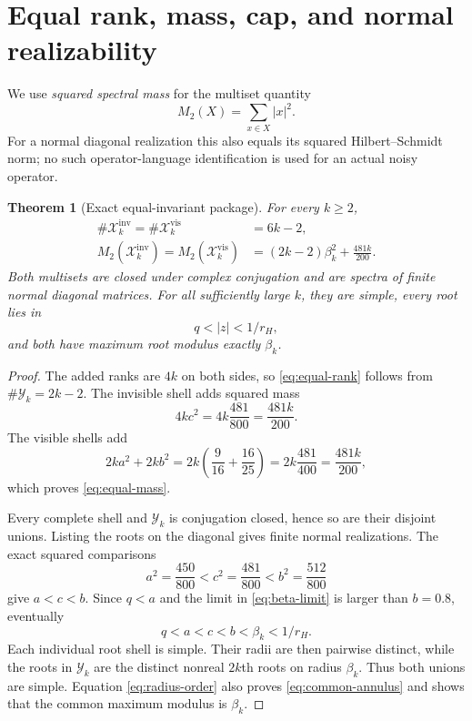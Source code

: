 \documentclass[11pt]{article}
\newtheorem{theorem}{Theorem}[section]
\theoremstyle{remark}
\newcommand{\cY}{\mathcal Y}
\newcommand{\cX}{\mathcal X}
\newcommand{\inv}{\mathrm{inv}}
\newcommand{\vis}{\mathrm{vis}}
\begin{document}
\section{Equal rank, mass, cap, and normal realizability}

We use \emph{squared spectral mass} for the multiset quantity
\begin{equation}\label{eq:squared-mass}
 M_2(X)=\sum_{x\in X}|x|^2.
\end{equation}
For a normal diagonal realization this also equals its squared
Hilbert--Schmidt norm; no such operator-language identification is used for
an actual noisy operator.

\begin{theorem}[Exact equal-invariant package]
\label{thm:equal-invariants}
For every $k\ge2$,
\begin{align}
 \#\cX_k^{\inv}=\#\cX_k^{\vis}&=6k-2,
 \label{eq:equal-rank}\\
 M_2(\cX_k^{\inv})=M_2(\cX_k^{\vis})
 &=(2k-2)\beta_k^2+\frac{481k}{200}.
 \label{eq:equal-mass}
\end{align}
Both multisets are closed under complex conjugation and are spectra of finite
normal diagonal matrices.  For all sufficiently large $k$, they are simple,
every root lies in
\begin{equation}\label{eq:common-annulus}
 q<|z|<1/r_H,
\end{equation}
and both have maximum root modulus exactly $\beta_k$.
\end{theorem}

\begin{proof}
The added ranks are $4k$ on both sides, so \eqref{eq:equal-rank} follows
from $\#\cY_k=2k-2$.  The invisible shell adds squared mass
\[
 4kc^2=4k\frac{481}{800}=\frac{481k}{200}.
\]
The visible shells add
\[
 2ka^2+2kb^2
 =2k\left(\frac9{16}+\frac{16}{25}\right)
 =2k\frac{481}{400}=\frac{481k}{200},
\]
which proves \eqref{eq:equal-mass}.

Every complete shell and $\cY_k$ is conjugation closed, hence so are their
disjoint unions.  Listing the roots on the diagonal gives finite normal
realizations.  The exact squared comparisons
\begin{equation}\label{eq:radius-squares}
 a^2=\frac{450}{800}<c^2=\frac{481}{800}
 <b^2=\frac{512}{800}
\end{equation}
give $a<c<b$.  Since $q<a$ and the limit in \eqref{eq:beta-limit} is larger
than $b=0.8$, eventually
\begin{equation}\label{eq:radius-order}
 q<a<c<b<\beta_k<1/r_H.
\end{equation}
Each individual root shell is simple.  Their radii are then pairwise
distinct, while the roots in $\cY_k$ are the distinct nonreal $2k$th roots
on radius $\beta_k$.  Thus both unions are simple.  Equation
\eqref{eq:radius-order} also proves \eqref{eq:common-annulus} and shows that
the common maximum modulus is $\beta_k$.
\end{proof}
\end{document}
